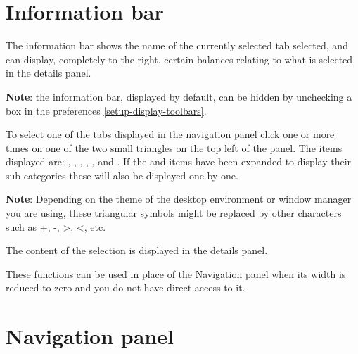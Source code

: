 \section{Information bar\label{home-synthesis}}

The information bar shows the name of the currently selected tab selected, and can display, completely to the right, certain balances relating to what is selected in the details panel.%


\textbf{Note}: the information bar, displayed by default, can be hidden by unchecking a box in the preferences \vref{setup-display-toolbars}.


To select one of the tabs displayed in the navigation panel click one or more times on one of the two small triangles on the top left of the panel.  The items displayed are: , , , , ,  and .  If the  and  items have been expanded to display their sub categories these will also be displayed one by one.


\textbf{Note}: Depending on the theme of the desktop environment or window manager you are using, these triangular symbols might be replaced by other characters such as +, -, >, <, etc.

The content of the selection is displayed in the details panel.

These functions can be used in place of the Navigation panel when its width is reduced to zero and you do not have direct access to it.


\section{Navigation panel\label{home-accounting}}

